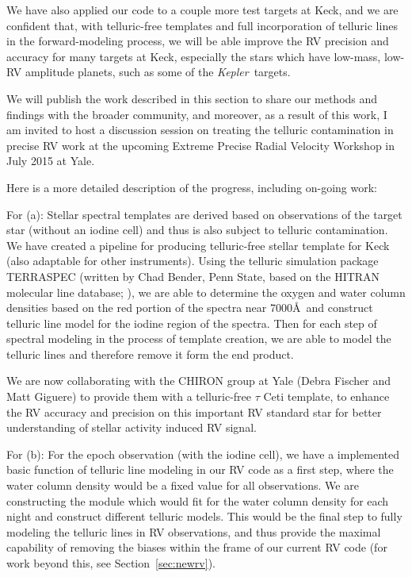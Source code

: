 \documentclass[12pt]{article}
\def\kepler{{\it Kepler}}
\begin{document}
We have also applied our code to a couple more test targets at Keck,
and we are confident that, with telluric-free templates and full
incorporation of telluric lines in the forward-modeling process, we
will be able improve the RV precision and accuracy for many targets at
Keck, especially the stars which have low-mass, low-RV amplitude
planets, such as some of the \kepler\ targets.

We will publish the work described in this section to share our
methods and findings with the broader community, and moreover, as a
result of this work, I am invited to host a discussion session on
treating the telluric contamination in precise RV work at the upcoming
Extreme Precise Radial Velocity Workshop in July 2015 at Yale.

Here is a more detailed description of the progress, including on-going work:

For (a): Stellar spectral templates are derived based on observations
of the target star (without an iodine cell) and thus is also subject
to telluric contamination. We have created a pipeline for producing
telluric-free stellar template for Keck (also adaptable for other
instruments). Using the telluric simulation package TERRASPEC (written
by Chad Bender, Penn State, based on the HITRAN molecular line
database; \citealt{hitran2012}), we are able to determine the oxygen and water
column densities based on the red portion of the spectra near
7000\AA\ and construct telluric line model for the iodine region of
the spectra. Then for each step of spectral modeling in the process of
template creation, we are able to model the telluric lines and
therefore remove it form the end product.

We are now collaborating with the CHIRON group at Yale (Debra Fischer
and Matt Giguere) to provide them with a telluric-free $\tau$ Ceti
template, to enhance the RV accuracy and precision on this important
RV standard star for better understanding of stellar activity induced
RV signal.

For (b): For the epoch observation (with the iodine cell), we have
a implemented basic function of telluric line modeling in our RV code as
a first step, where the water column density would be a fixed value
for all observations. We are constructing the module which would fit
for the water column density for each night and construct different
telluric models. This would be the final step to fully modeling the
telluric lines in RV observations, and thus provide the maximal
capability of removing the biases within the frame of our current RV
code (for work beyond this, see Section~\ref{sec:newrv}).
\end{document}

